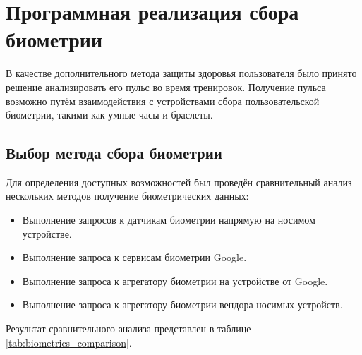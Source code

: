 \chapter{Программная реализация сбора биометрии}
В качестве дополнительного метода защиты здоровья пользователя было принято решение анализировать его пульс во время тренировок.
Получение пульса возможно путём взаимодействия с устройствами сбора пользовательской биометрии, такими как умные часы и браслеты.

\section{Выбор метода сбора биометрии}
Для определения доступных возможностей был проведён сравнительный анализ нескольких методов получение биометрических данных:
\begin{itemize}
	\item Выполнение запросов к датчикам биометрии напрямую на носимом устройстве.
	\item Выполнение запроса к сервисам биометрии Google.
	\item Выполнение запроса к агрегатору биометрии на устройстве от Google.
	\item Выполнение запроса к агрегатору биометрии вендора носимых устройств.
\end{itemize}
\smallskip
Результат сравнительного анализа представлен в таблице \ref{tab:biometrics_comparison}.


